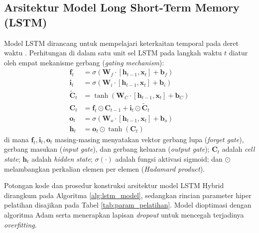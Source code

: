 \documentclass[10pt,a4paper]{article}
\begin{document}
\subsection{Arsitektur Model Long Short-Term Memory (LSTM)}
Model LSTM dirancang untuk mempelajari keterkaitan temporal pada deret waktu \cite{hochreiter1997}. Perhitungan di dalam satu unit sel LSTM pada langkah waktu $t$ diatur oleh empat mekanisme gerbang (\textit{gating mechanism}):
\begin{align}
  \mathbf{f}_t &= \sigma\left(\mathbf{W}_f \cdot [\mathbf{h}_{t-1}, \mathbf{x}_t] + \mathbf{b}_f\right) \label{eq:forget_gate} \\
  \mathbf{i}_t &= \sigma\left(\mathbf{W}_i \cdot [\mathbf{h}_{t-1}, \mathbf{x}_t] + \mathbf{b}_i\right) \label{eq:input_gate} \\
  \tilde{\mathbf{C}}_t &= \tanh\left(\mathbf{W}_C \cdot [\mathbf{h}_{t-1}, \mathbf{x}_t] + \mathbf{b}_C\right) \label{eq:candidate_cell} \\
  \mathbf{C}_t &= \mathbf{f}_t \odot \mathbf{C}_{t-1} + \mathbf{i}_t \odot \tilde{\mathbf{C}}_t \label{eq:cell_update} \\
  \mathbf{o}_t &= \sigma\left(\mathbf{W}_o \cdot [\mathbf{h}_{t-1}, \mathbf{x}_t] + \mathbf{b}_o\right) \label{eq:output_gate} \\
  \mathbf{h}_t &= \mathbf{o}_t \odot \tanh(\mathbf{C}_t) \label{eq:hidden_state}
\end{align}
di mana $\mathbf{f}_t, \mathbf{i}_t, \mathbf{o}_t$ masing-masing menyatakan vektor gerbang lupa (\textit{forget gate}), gerbang masukan (\textit{input gate}), dan gerbang keluaran (\textit{output gate}); $\mathbf{C}_t$ adalah \textit{cell state}; $\mathbf{h}_t$ adalah \textit{hidden state}; $\sigma(\cdot)$ adalah fungsi aktivasi sigmoid; dan $\odot$ melambangkan perkalian elemen per elemen (\textit{Hadamard product}).

Potongan kode dan prosedur konstruksi arsitektur model LSTM Hybrid dirangkum pada Algoritma \ref{alg:lstm_model}, sedangkan rincian parameter hiper pelatihan disajikan pada Tabel \ref{tab:param_pelatihan}. Model dioptimasi dengan algoritma Adam \cite{kingma2015adam} serta menerapkan lapisan \textit{dropout} \cite{srivastava2014dropout} untuk mencegah terjadinya \textit{overfitting}.
\end{document}
